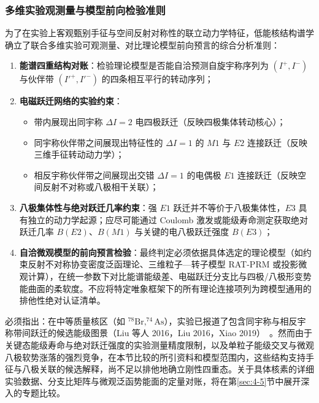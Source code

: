 \subsubsection{多维实验观测量与模型前向检验准则}

为了在实验上客观甄别手征与空间反射对称性的联立动力学特征，低能核结构谱学确立了联合多维实验可观测量、对比理论模型前向预言的综合分析准则：
\begin{enumerate}
\item \textbf{能谱四重结构对账}：检验理论模型是否能自洽预测自旋宇称序列为 $(I^+, I^-)$ 与伙伴带 $(I'^+, I'^-)$ 的四条相互平行的转动序列；
\item \textbf{电磁跃迁网络的实验约束}：
\begin{itemize}
\item 带内展现出同宇称 $\Delta I = 2$ 电四极跃迁（反映四极集体转动核心）；
\item 同宇称伙伴带之间展现出特征性的 $\Delta I = 1$ 的 $M1$ 与 $E2$ 连接跃迁（反映三维手征转动动力学）；
\item 相反宇称伙伴带之间展现出交错 $\Delta I = 1$ 的电偶极 $E1$ 连接跃迁（反映空间反射不对称或八极相干关联）；
\end{itemize}
\item \textbf{八极集体性与绝对跃迁几率约束}：强 $E1$ 跃迁并不等价于八极集体性，$E3$ 具有独立的动力学起源；应尽可能通过 Coulomb 激发或能级寿命测定获取绝对跃迁几率 $B(E2)$、$B(M1)$ 与关键的电八极跃迁强度 $B(E3)$；
\item \textbf{自洽微观模型的前向预言检验}：最终判定必须依据具体选定的理论模型（如约束反射不对称协变密度泛函理论、三维粒子—转子模型 RAT-PRM 或投影微观计算），在统一参数下对比能谱能级差、电磁跃迁分支比与四极/八极形变势能曲面的柔软度。不应将特定唯象框架下的所有理论连接项列为跨模型通用的排他性绝对认证清单。
\end{enumerate}

必须指出：在中等质量核区（如 $^{78}\mathrm{Br}, ^{74}\mathrm{As}$），实验已报道了包含同宇称与相反宇称带间跃迁的候选能级图景（Liu 等人 2016，Liu 2016，Xiao 2019）~\cite{liu-2016-octupole-correlations-multiple-chiral-doublet-bands-78br,liu-chen-2016-78br-chirality-reflection-symmetry-thesis,xiao-xiao-2019-high-spin-74as-thesis}。然而由于关键态能级寿命与绝对跃迁强度的实验测量精度限制，以及单粒子能级交叉与微观八极软势涨落的强烈竞争，在本节比较的所引资料和模型范围内，这些结构支持手征与八极关联的候选解释，尚不足以排他地确立刚性四重态。关于具体核素的详细实验数据、分支比矩阵与微观泛函势能面的定量对账，将在第\ref{sec:4-5}节中展开深入的专题比较。
